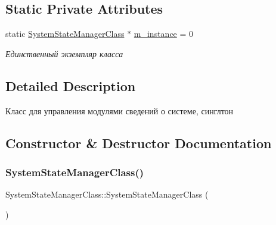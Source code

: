 \subsection*{Static Private Attributes}
\begin{DoxyCompactItemize}
\item 
static \hyperlink{class_system_state_manager_class}{System\+State\+Manager\+Class} $\ast$ \hyperlink{class_system_state_manager_class_a39700084963f2d7f4fd63d6049a09de2}{m\+\_\+instance} = 0
\begin{DoxyCompactList}\small\item\em Единственный экземпляр класса \end{DoxyCompactList}\end{DoxyCompactItemize}


\subsection{Detailed Description}
Класс для управления модулями сведений о системе, синглтон 

\subsection{Constructor \& Destructor Documentation}
\mbox{\label{class_system_state_manager_class_a83d355c7a99ed86fa46c7fce3d054927}} 
\subsubsection{\texorpdfstring{System\+State\+Manager\+Class()}{SystemStateManagerClass()}\hspace{0.1cm}{\footnotesize\ttfamily [1/2]}}
{\footnotesize\ttfamily System\+State\+Manager\+Class\+::\+System\+State\+Manager\+Class (\begin{DoxyParamCaption}{ }\end{DoxyParamCaption})\hspace{0.3cm}{\ttfamily [private]}}

\mbox{\label{class_system_state_manager_class_a879661dbbac7b5a581425f8c6de77a99}} 
